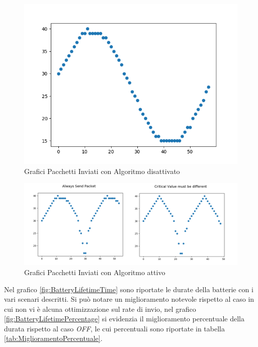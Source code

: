     \begin{center}
      \begin{figure}
        \centering
        \includegraphics[width=\linewidth]{../Immagini/OFF.png}
        \caption{Grafici Pacchetti Inviati con Algoritmo disattivato}
        \label{fig:off}
      \end{figure}

      \begin{figure}
        \centering
        \includegraphics[width=\linewidth]{../Immagini/MergeOn.png}
        \caption{Grafici Pacchetti Inviati con Algoritmo attivo}
        \label{fig:mergeOn}
      \end{figure}
    \end{center}

    Nel grafico \ref{fig:BatteryLifetimeTime} sono riportate le durate della batterie con i vari scenari descritti. Si può notare un miglioramento notevole rispetto al caso in cui non vi è alcuna ottimizzazione sul rate di invio,
    nel grafico \ref{fig:BatteryLifetimePercentage} si evidenzia il miglioramento percentuale della durata rispetto al caso \textit{OFF}, le cui percentuali sono riportate in tabella \ref{tab:MiglioramentoPercentuale}. 

